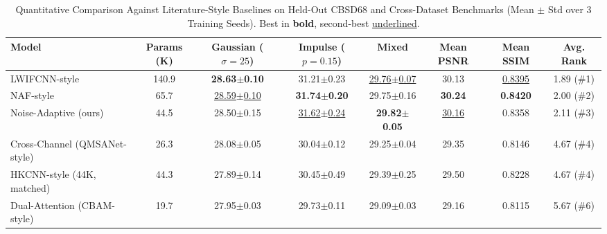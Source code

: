 \begin{table}[t]
\centering
\caption{Quantitative Comparison Against Literature-Style Baselines on Held-Out CBSD68 and Cross-Dataset Benchmarks (Mean $\pm$ Std over 3 Training Seeds). Best in \textbf{bold}, second-best \underline{underlined}.}
\label{tab:literature_comparison}
\setlength{\tabcolsep}{5pt}
\begin{tabular}{lccccccc}
\toprule
Model & Params (K) & Gaussian ($\sigma=25$) & Impulse ($p=0.15$) & Mixed & Mean PSNR & Mean SSIM & Avg. Rank \\
\midrule
LWIFCNN-style & 140.9 & \textbf{28.63$\pm$0.10} & 31.21$\pm$0.23 & \underline{29.76$\pm$0.07} & 30.13 & \underline{0.8395} & 1.89 (\#1) \\
NAF-style & 65.7 & \underline{28.59$\pm$0.10} & \textbf{31.74$\pm$0.20} & 29.75$\pm$0.16 & \textbf{30.24} & \textbf{0.8420} & 2.00 (\#2) \\
Noise-Adaptive (ours) & 44.5 & 28.50$\pm$0.15 & \underline{31.62$\pm$0.24} & \textbf{29.82$\pm$0.05} & \underline{30.16} & 0.8358 & 2.11 (\#3) \\
Cross-Channel (QMSANet-style) & 26.3 & 28.08$\pm$0.05 & 30.04$\pm$0.12 & 29.25$\pm$0.04 & 29.35 & 0.8146 & 4.67 (\#4) \\
HKCNN-style (44K, matched) & 44.3 & 27.89$\pm$0.14 & 30.45$\pm$0.49 & 29.39$\pm$0.25 & 29.50 & 0.8228 & 4.67 (\#4) \\
Dual-Attention (CBAM-style) & 19.7 & 27.95$\pm$0.03 & 29.73$\pm$0.11 & 29.09$\pm$0.03 & 29.16 & 0.8115 & 5.67 (\#6) \\
\bottomrule
\end{tabular}
\end{table}
